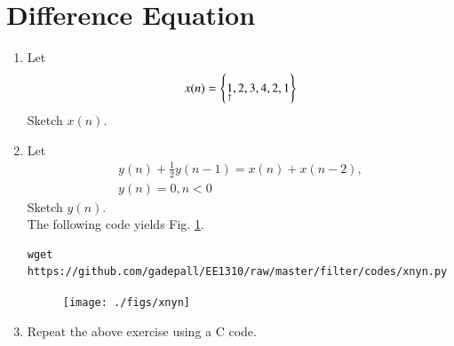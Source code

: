 \documentclass[journal,12pt,twocolumn]{IEEEtran}
\renewcommand\thesection{\arabic{section}}
\begin{document}
\section{Difference Equation}
\begin{enumerate}[label=\thesection.\arabic*,ref=\thesection.\theenumi]
\item Let
	\label{def:xn}
\begin{equation}
x(n) = \left\{\underset{\uparrow}{1},2,3,4,2,1\right\}
\end{equation}
Sketch $x(n)$.
\item Let
\begin{multline}
\label{eq:iir_filter}
y(n) + \frac{1}{2}y(n-1) = x(n) + x(n-2), 
\\
 y(n) = 0, n < 0
\end{multline}
Sketch $y(n)$.  
\\
\solution The following code yields Fig. \ref{fig:xnyn}.
\begin{lstlisting}
wget https://github.com/gadepall/EE1310/raw/master/filter/codes/xnyn.py
\end{lstlisting}
\begin{figure}[!ht]
\begin{center}
\texttt{[image: ./figs/xnyn]}
\end{center}
\label{fig:xnyn}	
\end{figure}
\item Repeat the above exercise using a C code.

\end{enumerate}
\end{document}
